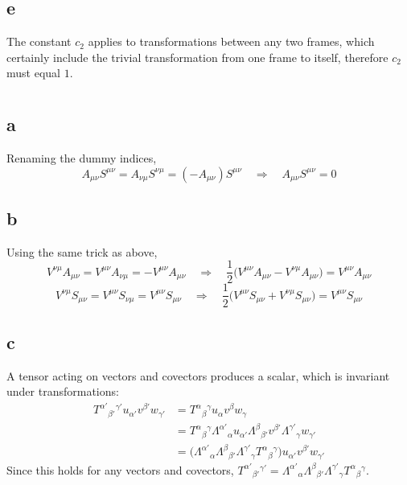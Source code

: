 \documentclass{article}
\begin{document}
\subsection*{e}
The constant $c_2$ applies to transformations between any two frames, which certainly include the trivial transformation from one frame to itself, therefore $c_2$ must equal $1$.

\section{}
\subsection*{a}
Renaming the dummy indices,
\[ A_{\mu\nu}S^{\mu\nu} = A_{\nu\mu}S^{\nu\mu} = (-A_{\mu\nu})S^{\mu\nu}
	\quad\Rightarrow\quad A_{\mu\nu}S^{\mu\nu} = 0 \]
\subsection*{b}
Using the same trick as above,
\[ V^{\nu\mu}A_{\mu\nu} = V^{\mu\nu}A_{\nu\mu} = - V^{\mu\nu}A_{\mu\nu}
	\quad\Rightarrow\quad \frac{1}{2}\Big( V^{\mu\nu}A_{\mu\nu} - V^{\nu\mu}A_{\mu\nu}\Big) =  V^{\mu\nu}A_{\mu\nu}  \]
\[ V^{\nu\mu}S_{\mu\nu} = V^{\mu\nu}S_{\nu\mu} = V^{\mu\nu}S_{\mu\nu}
	\quad\Rightarrow\quad \frac{1}{2}\Big( V^{\mu\nu}S_{\mu\nu} + V^{\nu\mu}S_{\mu\nu}\Big) =  V^{\mu\nu}S_{\mu\nu}  \]
\subsection*{c}
A tensor acting on vectors and covectors produces a scalar, which is invariant under transformations: 
\begin{align*}
	 T^{\alpha'}{}_{\beta'}{}^{\gamma'}u_{\alpha'}v^{\beta'}w_{\gamma'} 
	&= T^{\alpha}{}_{\beta}{}^{\gamma}u_{\alpha}v^{\beta}w_{\gamma}\\
	&= T^{\alpha}{}_{\beta}{}^{\gamma}\Lambda^{\alpha'}{}_{\alpha} u_{\alpha'}\Lambda^{\beta}{}_{\beta'}v^{\beta'} \Lambda^{\gamma'}{}_{\gamma}w_{\gamma'} \\
	&= \Big(\Lambda^{\alpha'}{}_{\alpha} \Lambda^{\beta}{}_{\beta'} \Lambda^{\gamma'}{}_{\gamma} T^{\alpha}{}_{\beta}{}^{\gamma}\Big) u_{\alpha'}v^{\beta'} w_{\gamma'}
\end{align*}
Since this holds for any vectors and covectors, $T^{\alpha'}{}_{\beta'}{}^{\gamma'}= \Lambda^{\alpha'}{}_{\alpha} \Lambda^{\beta}{}_{\beta'} \Lambda^{\gamma'}{}_{\gamma} T^{\alpha}{}_{\beta}{}^{\gamma}$.
\end{document}
